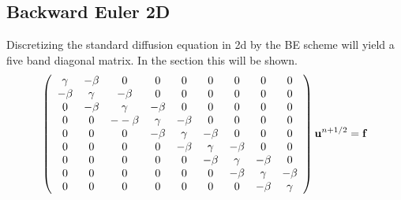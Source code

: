 \subsection{Backward Euler 2D}
Discretizing the standard diffusion equation in 2d by the BE scheme will yield a five band diagonal matrix. 
In the section this will be shown.
\begin{align}
  \left(\begin{array}{c c c c c c c c c}
        \gamma & -\beta &0 &0 &0 &0 &0 &0 &0\\
        -\beta & \gamma & -\beta &0 &0 &0 &0 &0 &0\\
        0& -\beta & \gamma & -\beta & 0 & 0 &0&0&0\\
        0& 0&--\beta & \gamma & -\beta & 0 & 0 &0&0\\
        0& 0&0&-\beta & \gamma & -\beta & 0 & 0 &0\\
        0& 0&0&0&-\beta & \gamma & -\beta & 0 &0\\
        0& 0 &0 &0 &0&-\beta & \gamma & -\beta&0\\
        0& 0 &0 &0 &0&0&-\beta & \gamma &-\beta\\
         0&0 &0 &0&0 &0&0&-\beta & \gamma
       \end{array}\right)\mathbf{u}^{n+1/2} = \mathbf{f}
\end{align}
